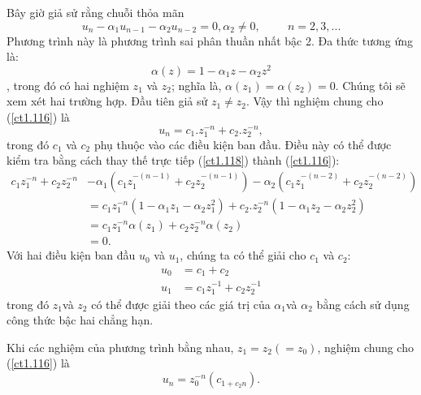 \documentclass[12pt, a4paper,oneside]{book}
\theoremstyle{definition}
\begin{document}
Bây giờ giả sử rằng chuỗi thỏa mãn
\begin{equation}
u_{n}-\alpha_{1}u_{n-1}-\alpha_{2}u_{n-2}=0, \alpha_{2}\neq 0, \hspace{1cm} n=2,3,...\label{ct1.116}
\end{equation}
Phương trình này là phương trình sai phân thuần nhất bậc 2. Đa thức tương ứng là:
$$\alpha(z)=1-\alpha_{1}z-\alpha_{2}z^{2}$$, trong đó có hai nghiệm $z_{1}$ và $z_{2}$; nghĩa là, $\alpha(z_{1})=\alpha(z_{2})=0$. Chúng tôi sẽ xem xét hai trường hợp. Đầu tiên giả sử $z_{1}\neq z_{2}$. Vậy thì nghiệm chung cho (\ref{ct1.116}) là
\begin{equation}
u_{n}=c_{1}. z_{1}^{-n} + c_{2}. z_{2}^{-n}, \label{ct1.118}
\end{equation}
trong đó $c_{1}$ và $c_{2}$ phụ thuộc vào các điều kiện ban đầu. Điều này có thể được kiểm tra bằng cách thay thế trực tiếp (\ref{ct1.118}) thành (\ref{ct1.116}):
\begin{align*}
c_{1}z_{1}^{-n}  + c_{2}z_{2}^{-n} &- \alpha_{1} (c_{1}z_{1}^{-(n-1)}+ 	c_{2} z_{2}^{-(n-1)}) - \alpha_{2} (	c_{1} z_{1}^{-(n-2)}+ 	c_{2} z_{2}^{-(n-2)})\\
&= c_{1}z_{1}^{-n}(1-\alpha_{1}z_{1}-\alpha_{2}z_{1}^{2}) +  c_{2}. z_{2}^{-n}(1-\alpha_{1}z_{2}-\alpha_{2}z_{2}^{2})\\
&=c_{1}z_{1}^{-n}\alpha(z_{1}) + c_{2}z_{2}^{-n}\alpha(z_{2})\\
&=0.
\end{align*}
Với hai điều kiện ban đầu $u_{0}$ và $u_{1}$, chúng ta có thể giải cho $c_{1}$ và $c_{2}$:
\begin{align*}
u_{0}&= c_{1}+ c_{2}\\
u_{1}&=c_{1}z_{1}^{-1} + c_{2}z_{2}^{-1}
\end{align*}
trong đó $z_{1}$và $z_{2}$ có thể được giải theo các giá trị của $\alpha_{1} $và $\alpha_{2} $ bằng cách sử dụng công thức bậc hai chẳng hạn.

Khi các nghiệm của phương trình bằng nhau, $z_{1}=z_{2} (=z_{0})$, nghiệm chung cho (\ref{ct1.116}) là
\begin{equation}
u_{n}= z_{0}^{-n} (c_{1 +c_{2}n}). \label{ct1.119}
\end{equation}
\end{document}
